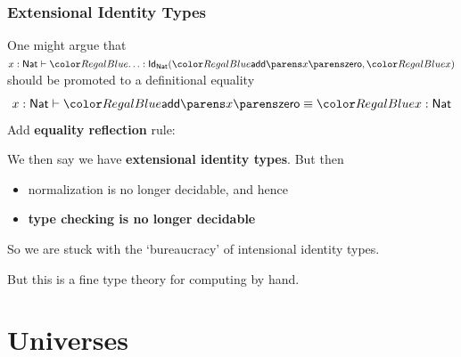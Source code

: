 \documentclass[handout]{beamer} %
\begin{document}
\begin{frame}
  \frametitle{Extensional Identity Types}
  
  One might argue that $
    \IsTm[x : \Nat]{\ldots}{
      \Id{\Nat}{
        \App{\App{\textsf{add}}{x}}{\Zero}
      }{
        x
      }
    }
  $
  should be promoted to a definitional equality
  \[
    \EqTm[x : \Nat]{
      \App{\App{\textsf{add}}{x}}{\Zero}
    }{
      x
    }{\Nat}
  \]
  Add \textbf{equality reflection} rule: %
  \begin{mathpar}
  \end{mathpar}
  We then say we have \textbf{extensional identity types}. But then
  \begin{itemize}
    \item normalization is no longer decidable, and hence
    \item \textbf{type checking is no longer decidable}
  \end{itemize}
  

  So we are stuck with the `bureaucracy' of intensional identity types.
  
  \medskip
  
  But this is a fine type theory for computing by hand.


\end{frame}

\section{Universes}
\end{document}
